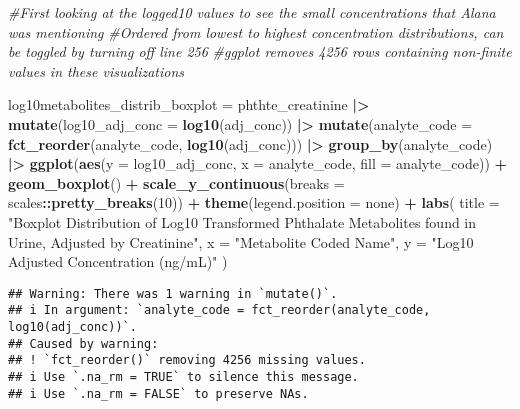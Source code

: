 \documentclass[
]{article}
\newenvironment{Shaded}{\begin{snugshade}}{\end{snugshade}}
\newcommand{\AttributeTok}[1]{\textcolor[rgb]{0.13,0.29,0.53}{#1}}
\newcommand{\CommentTok}[1]{\textcolor[rgb]{0.56,0.35,0.01}{\textit{#1}}}
\newcommand{\DecValTok}[1]{\textcolor[rgb]{0.00,0.00,0.81}{#1}}
\newcommand{\FunctionTok}[1]{\textcolor[rgb]{0.13,0.29,0.53}{\textbf{#1}}}
\newcommand{\NormalTok}[1]{#1}
\newcommand{\OtherTok}[1]{\textcolor[rgb]{0.56,0.35,0.01}{#1}}
\newcommand{\SpecialCharTok}[1]{\textcolor[rgb]{0.81,0.36,0.00}{\textbf{#1}}}
\newcommand{\StringTok}[1]{\textcolor[rgb]{0.31,0.60,0.02}{#1}}
\begin{document}
\begin{Shaded}
\begin{Highlighting}[]
\CommentTok{\#First looking at the logged10 values to see the small concentrations that Alana was mentioning}
\CommentTok{\#Ordered from lowest to highest concentration distributions, can be toggled by turning off line 256}
\CommentTok{\#ggplot removes 4256 rows containing non{-}finite values in these visualizations}

\NormalTok{log10metabolites\_distrib\_boxplot }\OtherTok{=}\NormalTok{ phthte\_creatinine }\SpecialCharTok{|\textgreater{}} 
  \FunctionTok{mutate}\NormalTok{(}\AttributeTok{log10\_adj\_conc =} \FunctionTok{log10}\NormalTok{(adj\_conc)) }\SpecialCharTok{|\textgreater{}} 
  \FunctionTok{mutate}\NormalTok{(}\AttributeTok{analyte\_code =} \FunctionTok{fct\_reorder}\NormalTok{(analyte\_code, }\FunctionTok{log10}\NormalTok{(adj\_conc))) }\SpecialCharTok{|\textgreater{}} 
  \FunctionTok{group\_by}\NormalTok{(analyte\_code) }\SpecialCharTok{|\textgreater{}} 
  \FunctionTok{ggplot}\NormalTok{(}\FunctionTok{aes}\NormalTok{(}\AttributeTok{y =}\NormalTok{ log10\_adj\_conc, }\AttributeTok{x =}\NormalTok{ analyte\_code, }\AttributeTok{fill =}\NormalTok{ analyte\_code)) }\SpecialCharTok{+} \FunctionTok{geom\_boxplot}\NormalTok{() }\SpecialCharTok{+} 
  \FunctionTok{scale\_y\_continuous}\NormalTok{(}\AttributeTok{breaks =}\NormalTok{ scales}\SpecialCharTok{::}\FunctionTok{pretty\_breaks}\NormalTok{(}\DecValTok{10}\NormalTok{)) }\SpecialCharTok{+} \FunctionTok{theme}\NormalTok{(}\AttributeTok{legend.position =} \StringTok{\textquotesingle{}none\textquotesingle{}}\NormalTok{) }\SpecialCharTok{+}
   \FunctionTok{labs}\NormalTok{(}
    \AttributeTok{title =} \StringTok{"Boxplot Distribution of Log10 Transformed Phthalate Metabolites found in Urine, Adjusted by Creatinine"}\NormalTok{,}
    \AttributeTok{x =} \StringTok{"Metabolite Coded Name"}\NormalTok{,}
    \AttributeTok{y =} \StringTok{"Log10 Adjusted Concentration (ng/mL)"}
\NormalTok{  )}
\end{Highlighting}
\end{Shaded}

\begin{verbatim}
## Warning: There was 1 warning in `mutate()`.
## i In argument: `analyte_code = fct_reorder(analyte_code, log10(adj_conc))`.
## Caused by warning:
## ! `fct_reorder()` removing 4256 missing values.
## i Use `.na_rm = TRUE` to silence this message.
## i Use `.na_rm = FALSE` to preserve NAs.
\end{verbatim}
\end{document}

